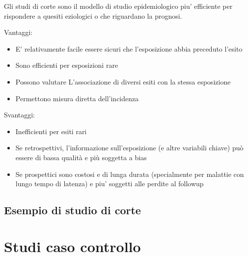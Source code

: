 \documentclass[]{book}
\begin{document}
Gli studi di corte sono il modello di studio epidemiologico piu' efficiente per rispondere a quesiti eziologici o che riguardano la prognosi.

Vantaggi:

\begin{itemize}
\item
  E' relativamente facile essere sicuri che l'esposizione abbia preceduto l'esito
\item
  Sono efficienti per esposizioni rare
\item
  Possono valutare L'associazione di diversi esiti con la stessa esposizione
\item
  Permettono misura diretta dell'incidenza
\end{itemize}

Svantaggi:

\begin{itemize}
\item
  Inefficienti per esiti rari
\item
  Se retrospettivi, l'informazione sull'esposizione (e altre variabili chiave) può essere di bassa qualità e più soggetta a bias
\item
  Se prospettici sono costosi e di lunga durata (specialmente per malattie con lungo tempo di latenza) e piu' soggetti alle perdite al followup
\end{itemize}

\hypertarget{esempio-di-studio-di-corte}{%
\subsection{Esempio di studio di corte}\label{esempio-di-studio-di-corte}}

\hypertarget{studi-caso-controllo}{%
\section{Studi caso controllo}\label{studi-caso-controllo}}
\end{document}
